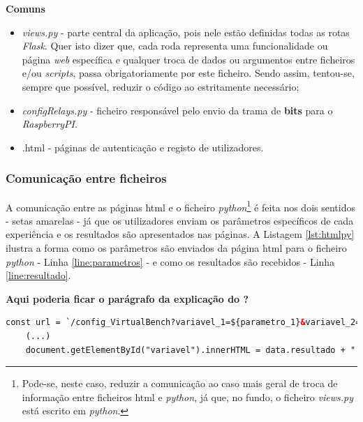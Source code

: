 \textbf{Comuns}
\begin{itemize}
	\item \textit{views.py} - parte central da aplicação, pois nele estão definidas todas as rotas \textit{Flask}. Quer isto dizer que, cada roda representa uma funcionalidade ou página \textit{web} específica e qualquer troca de dados ou argumentos entre ficheiros e/ou \textit{scripts}, passa obrigatoriamente por este ficheiro. Sendo assim, tentou-se, sempre que possível, reduzir o código ao estritamente necessário;
	\item \textit{configRelays.py} - ficheiro responsável pelo envio da trama de \textbf{bits} para o \textit{RaspberryPI}.
	\item {}.html - páginas de autenticação e registo de utilizadores.
\end{itemize}

\subsubsection{Comunicação entre ficheiros}
\label{sec:comunicacaoentrefich}
A comunicação entre as páginas \acrshort{html} e o ficheiro \textit{python}\footnote{Pode-se, neste caso, reduzir a comunicação ao caso mais geral de troca de informação entre ficheiros \acrshort{html} e \textit{python}, já que, no fundo, o ficheiro \textit{views.py} está escrito em \textit{python}.} é feita nos dois sentidos - setas amarelas - já que os utilizadores enviam os parâmetros específicos de cada experiência e os resultados são apresentados nas páginas. A Listagem \ref{lst:htmlpy} ilustra a forma como os parâmetros são enviados da página \acrshort{html} para o ficheiro \textit{python} - Linha \ref{line:parametros} - e como os resultados são recebidos - Linha \ref{line:resultado}.

\textbf{Aqui poderia ficar o parágrafo da explicação do ?}

\begin{minipage}{0.9\linewidth}
	\begin{lstlisting}[language=html, escapechar=|, caption=Comunicação \acrshort{html} - \textit{views.py}, label=lst:htmlpy]
	const url = `/config_VirtualBench?variavel_1=${parametro_1}&variavel_2=${parametro_2}&variavel_3=${parametro_3}`; |\label{line:parametros}|
	(...)
	document.getElementById("variavel").innerHTML = data.resultado + " V"; |\label{line:resultado}|
	\end{lstlisting}
\end{minipage}

